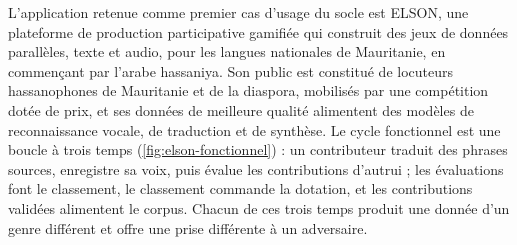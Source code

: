 L'application retenue comme premier cas d'usage du socle est ELSON, une plateforme de production
participative gamifiée qui construit des jeux de données parallèles, texte et audio, pour les
langues nationales de Mauritanie, en commençant par l'arabe hassaniya. Son public est constitué
de locuteurs hassanophones de Mauritanie et de la diaspora, mobilisés par une compétition dotée
de prix, et ses données de meilleure qualité alimentent des modèles de reconnaissance vocale, de
traduction et de synthèse. Le cycle fonctionnel est une boucle à trois temps
(\cref{fig:elson-fonctionnel}) : un contributeur traduit des phrases sources, enregistre sa voix,
puis évalue les contributions d'autrui ; les évaluations font le classement, le classement
commande la dotation, et les contributions validées alimentent le corpus. Chacun de ces trois
temps produit une donnée d'un genre différent et offre une prise différente à un adversaire.

